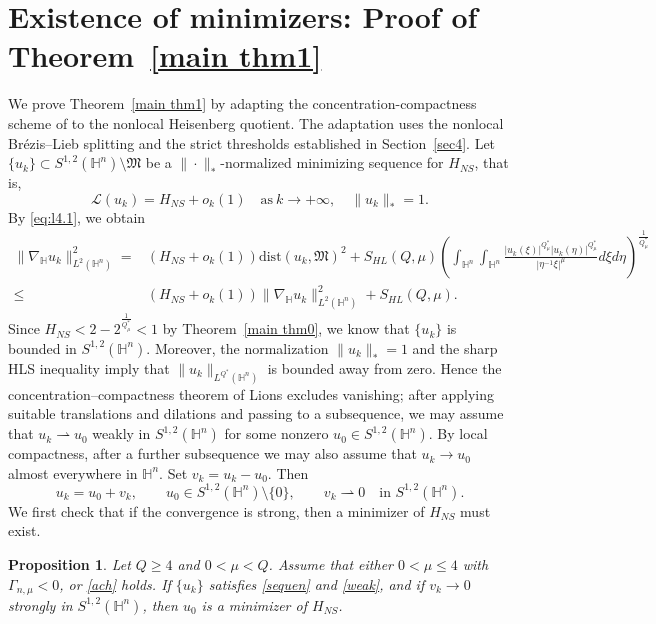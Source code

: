 \documentclass[10pt,a4paper]{amsart}
\newtheorem{proposition}{Proposition}[section]
\begin{document}
\section{Existence of minimizers: Proof of Theorem~\ref{main thm1}}\label{sec5}
We prove Theorem~\ref{main thm1} by adapting the concentration-compactness scheme of \cite{K25} to the nonlocal Heisenberg quotient. The adaptation uses the nonlocal Br\'{e}zis--Lieb splitting and the strict thresholds established in Section~\ref{sec4}.
Let $\{u_k\}\subset S^{1,2}(\mathbb{H}^{n})\setminus \mathfrak{M}$ be a $\|\cdot\|_*$-normalized minimizing sequence for $H_{NS}$, that is,
 \begin{equation}\label{sequen}
 \mathcal {L}(u_k)=H_{NS}+o_k(1)\quad \mathrm{as}~k\rightarrow+\infty,\quad \|u_k\|_*=1.
 \end{equation}
{By \eqref{eq:l4.1}, we obtain}
\begin{align*}
 \|\nabla_\mathbb{H} u_k\|_{L^2(\mathbb{H}^n)}^2=&(H_{NS}+o_k(1))\mathrm{dist}(u_k,\mathfrak{M})^2+S_{HL}(Q,\mu) \left(\int_{\mathbb{H}^{n}}\int_{\mathbb{H}^{n}}\frac{|u_k(\xi)|^{Q^{\ast}_{\mu}}|u_k(\eta)|
^{Q^{\ast}_{\mu}}}{|\eta^{-1}\xi|^{\mu}}{d}\xi{d}\eta\right)^{\frac{1}{Q^{\ast}_{\mu}}}\\
\leq&
 (H_{NS}+o_k(1))\|\nabla_\mathbb{H} u_k\|_{L^2(\mathbb{H}^n)}^2+S_{HL}(Q,\mu).
\end{align*}
Since $H_{NS}<2-2^{\frac{1}{Q^{\ast}_{\mu}}}<1$ by Theorem~\ref{main thm0}, we know that $\{u_k\}$ is bounded in $S^{1,2}(\mathbb{H}^{n})$. {Moreover, the normalization $\|u_k\|_*=1$ and the sharp HLS inequality imply that $\|u_k\|_{L^{Q^{\ast}}(\mathbb H^n)}$ is bounded away from zero. Hence the concentration--compactness theorem of Lions \cite{L85} excludes vanishing; after applying suitable translations and dilations and passing to a subsequence, we may assume that $u_k\rightharpoonup u_0$ weakly in $S^{1,2}(\mathbb{H}^{n})$ for some nonzero $u_0\in S^{1,2}(\mathbb{H}^{n})$. By local compactness, after a further subsequence we may also assume that $u_k\to u_0$ almost everywhere in $\mathbb H^n$.} {Set $v_k=u_k-u_0$. Then}
\begin{equation}\label{weak}
 {u_k=u_0+v_k,\qquad u_0\in S^{1,2}(\mathbb H^n)\setminus\{0\},\qquad v_k\rightharpoonup0\quad\text{in }S^{1,2}(\mathbb H^n).}
\end{equation}
We first check that if the convergence is strong, then a minimizer of $H_{NS}$ must exist.
\begin{proposition}\label{promini}
Let $Q\geq4$ and $0<\mu<Q$. Assume that either $0<\mu\leq4$ with $\Gamma_{n,\mu}<0$, or \eqref{ach} holds. {If $\{u_k\}$ satisfies \eqref{sequen} and \eqref{weak}, and if $v_k\to0$ strongly in $S^{1,2}(\mathbb{H}^{n})$, then $u_0$ is a minimizer of $H_{NS}$.}
\end{proposition}
\end{document}

